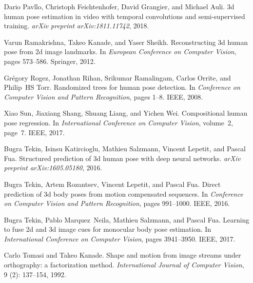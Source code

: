 \documentclass{bmvc2k}
\begin{document}
\begin{thebibliography}{42}
Dario Pavllo, Christoph Feichtenhofer, David Grangier, and Michael Auli.
\newblock 3d human pose estimation in video with temporal convolutions and
  semi-supervised training.
\newblock \emph{arXiv preprint arXiv:1811.11742}, 2018.

Varun Ramakrishna, Takeo Kanade, and Yaser Sheikh.
\newblock Reconstructing 3d human pose from 2d image landmarks.
\newblock In \emph{European Conference on Computer Vision}, pages 573--586.
  Springer, 2012.

Gr{\'e}gory Rogez, Jonathan Rihan, Srikumar Ramalingam, Carlos Orrite, and
  Philip~HS Torr.
\newblock Randomized trees for human pose detection.
\newblock In \emph{Conference on Computer Vision and Pattern Recognition},
  pages 1--8. IEEE, 2008.

Xiao Sun, Jiaxiang Shang, Shuang Liang, and Yichen Wei.
\newblock Compositional human pose regression.
\newblock In \emph{International Conference on Computer Vision}, volume~2,
  page~7. IEEE, 2017.

Bugra Tekin, Isinsu Katircioglu, Mathieu Salzmann, Vincent Lepetit, and Pascal
  Fua.
\newblock Structured prediction of 3d human pose with deep neural networks.
\newblock \emph{arXiv preprint arXiv:1605.05180}, 2016{}.

Bugra Tekin, Artem Rozantsev, Vincent Lepetit, and Pascal Fua.
\newblock Direct prediction of 3d body poses from motion compensated sequences.
\newblock In \emph{Conference on Computer Vision and Pattern Recognition},
  pages 991--1000. IEEE, 2016{}.

Bugra Tekin, Pablo Marquez~Neila, Mathieu Salzmann, and Pascal Fua.
\newblock Learning to fuse 2d and 3d image cues for monocular body pose
  estimation.
\newblock In \emph{International Conference on Computer Vision}, pages
  3941--3950. IEEE, 2017.

Carlo Tomasi and Takeo Kanade.
\newblock Shape and motion from image streams under orthography: a
  factorization method.
\newblock \emph{International Journal of Computer Vision}, 9
  (2): 137--154, 1992.


\end{thebibliography}
\end{document}
